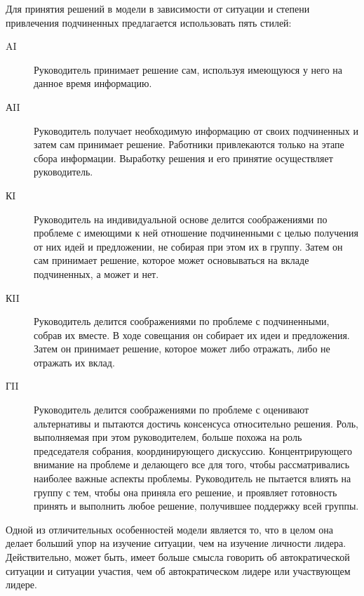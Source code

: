 \documentclass[a4paper,12pt,oneside,final]{extarticle}
\numberwithin{equation}{section}
\begin{document}
Для принятия решений в модели в зависимости от ситуации и степени привлечения подчиненных предлагается использовать пять стилей: 
\begin{description}
	\item[AI] Руководитель принимает решение сам, используя имеющуюся у него на данное время информацию.
	\item[АII] Руководитель получает необходимую информацию от своих подчиненных и затем сам принимает решение. 
	Работники привлекаются только на этапе сбора информации. 
	Выработку решения и его принятие осуществляет руководитель.
	\item[КI] Руководитель на индивидуальной основе делится соображениями по проблеме с имеющими к ней отношение подчиненными с целью получения от них идей и предложении, не собирая при этом их в группу. 
	Затем он сам принимает решение, которое может основываться на вкладе подчиненных, а может и нет.
	\item[КII] Руководитель делится соображениями по проблеме с подчиненными, собрав их вместе. 
	В ходе совещания он собирает их идеи и предложения. 
	Затем он принимает решение, которое может либо отражать, либо не отражать их вклад.
	\item[ГII] Руководитель делится соображениями по проблеме с оценивают альтернативы и пытаются достичь консенсуса относительно решения. 
	Роль, выполняемая при этом руководителем, больше похожа на роль председателя собрания, координирующего дискуссию. 
	Концентрирующего внимание на проблеме и делающего все для того, чтобы рассматривались наиболее важные аспекты проблемы. 
	Руководитель не пытается влиять на группу с тем, чтобы она приняла его решение, и проявляет готовность принять и выполнить любое решение, получившее поддержку всей группы. 
\end{description}

Одной из отличительных особенностей модели является то, что в целом она делает больший упор на изучение ситуации, чем на изучение личности лидера.
Действительно, может быть, имеет больше смысла говорить об автократической ситуации и ситуации участия, чем об автократическом лидере или участвующем лидере.
\end{document}
